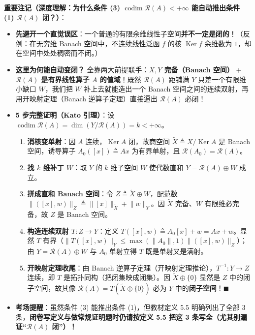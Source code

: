 \documentclass[11pt,a4paper]{article}
\providecommand{\tightlist}{\setlength{\itemsep}{2pt}\setlength{\parskip}{0pt}}
\renewenvironment{quote}{%
  \begin{tcolorbox}[
    enhanced,
    breakable,
    colback=AccentSoft!48!white,
    colframe=AccentMain,
    boxrule=0pt,
    leftrule=2.8pt,
    arc=2.5pt,
    left=9pt, right=8pt, top=6pt, bottom=6pt,
    before skip=5.5pt, after skip=5.5pt
  ]\small
}{%
  \end{tcolorbox}%
}
\begin{document}
\begin{quote}
\textbf{重要注记（深度理解：为什么条件 (3) \(\operatorname{codim}\mathcal{R}(A) < +\infty\) 能自动推出条件 (1) \(\mathcal{R}(A)\) 闭？）}：

\begin{itemize}
\tightlist
\item
  \textbf{先避开一个直觉误区}：一个普通的有限余维线性子空间\textbf{并不一定是闭的}！（反例：在无穷维 Banach 空间中，不连续线性泛函 \(f\) 的核 \(\operatorname{Ker} f\) 余维数为 \(1\)，却在空间中处处稠密而不闭。）
\item
  \textbf{这里为何能自动变闭？} 全靠两大前提联手：\textbf{\(X, Y\) 完备（Banach 空间）} \(+\) \textbf{\(\mathcal{R}(A)\) 是有界线性算子 \(A\) 的值域}！既然 \(\mathcal{R}(A)\) 距铺满 \(Y\) 只差一个有限维小缺口 \(W\)，我们把 \(W\) 补上去就能造出一个 Banach 空间之间的连续双射，再用开映射定理（Banach 逆算子定理）直接逼出 \(\mathcal{R}(A)\) 必闭！
\item
  \textbf{5 步完整证明（Kato 引理）}：设 \(\operatorname{codim}\mathcal{R}(A) = \dim(Y/\mathcal{R}(A)) = k < +\infty\)。

  \begin{enumerate}
  \def\labelenumi{\arabic{enumi}.}
  \tightlist
  \item
    \textbf{消核变单射}：因 \(A\) 连续，\(\operatorname{Ker}A\) 闭，故商空间 \(\tilde{X} \triangleq X/\operatorname{Ker}A\) 是 Banach 空间，诱导算子 \(A_0([x]) \triangleq Ax\) 为有界单射，且 \(\mathcal{R}(A_0) = \mathcal{R}(A)\)。
  \item
    \textbf{找 \(k\) 维补丁 \(W\)}：取 \(Y\) 的 \(k\) 维子空间 \(W\) 使代数直和 \(Y = \mathcal{R}(A) \oplus W\) 成立。
  \item
    \textbf{拼成直和 Banach 空间}：令 \(Z \triangleq \tilde{X} \oplus W\)，配范数 \(\lVert([x], w)\rVert_Z \triangleq \lVert[x]\rVert_{\tilde{X}} + \lVert w\rVert_Y\)。因 \(\tilde{X}\) 完备、\(W\) 有限维必完备，故 \(Z\) 是 Banach 空间。
  \item
    \textbf{构造连续双射 \(T: Z \to Y\)}：定义 \(T([x], w) \triangleq A_0[x] + w = Ax + w\)。显然 \(T\) 有界（\(\lVert T([x],w)\rVert_Y \le \max(\lVert A_0\rVert, 1)\lVert([x],w)\rVert_Z\)）；由 \(Y = \mathcal{R}(A) \oplus W\) 与 \(A_0\) 单射立得 \(T\) 既是单射又是满射。
  \item
    \textbf{开映射定理收尾}：由 Banach 逆算子定理（开映射定理推论），\(T^{-1}: Y \to Z\) 连续，即 \(T\) 是拓扑同构（把闭集映成闭集）。因 \(\tilde{X} \oplus \{0\}\) 显然是 \(Z\) 中的闭子空间，故其像 \(\mathcal{R}(A) = T(\tilde{X} \oplus \{0\})\) 必为 \(Y\) 中的\textbf{闭子空间}！\(\blacksquare\)
  \end{enumerate}
\item
  \textbf{考场提醒}：虽然条件 (3) 能推出条件 (1)，但教材定义 5.5 明确列出了全部 3 条，\textbf{闭卷写定义与做常规证明题时仍请按定义 5.5 把这 3 条写全（尤其别漏证``\(\mathcal{R}(A)\) 闭''）！}
\end{itemize}
\end{quote}
\end{document}
